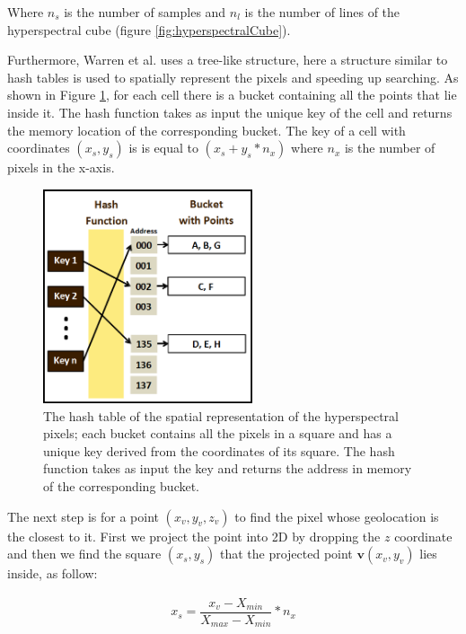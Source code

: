 \documentclass{subfiles}
\begin{document}
	\par Where $n_s$ is the number of samples and $n_l$ is the number of lines of the hyperspectral cube (figure \ref{fig:hyperspectralCube}).
	
	\par {\color{blue}Furthermore, Warren et al. \cite{Warren2014} uses a tree-like structure, here a structure similar to hash tables is used to spatially represent the pixels and speeding up searching. As shown in Figure \ref{fig:HashTable}, for each cell there is a bucket containing all the points that lie inside it. The hash function takes as input the unique key of the cell and returns the memory location of the corresponding bucket. The key of a cell with coordinates $(x_s,y_s)$ is is equal to $(x_s + y_s *n_x)$ where $n_x$ is the number of pixels in the x-axis.}
	
	 \begin{figure} [h!]
	 	\centering
	 	\includegraphics[width=0.55\textwidth]{img/HashTable}
	 	\caption[Hash Table]{The hash table of the spatial representation of the hyperspectral pixels; each bucket contains all the pixels in a square and has a unique key derived from the coordinates of its square. The hash function takes as input the key and returns the address in memory of the corresponding bucket. }
	 	\label{fig:HashTable}
	 \end{figure}
	
	\par The next step is for a point $(x_v, y_v, z_v)$ to find the pixel whose geolocation is the closest to it. First we project the point into 2D by dropping the $z$ coordinate and then we find the square $(x_s , y_s )$ that the projected point $\mathbf{v}(x_v , y_v)$ lies inside, as follow: 
	
    \begin{eqnarray}
	    x_s = \dfrac{x_v-X_{min}}{X_{max}-X_{min}} * n_x
    \end{eqnarray}
	
\end{document}
